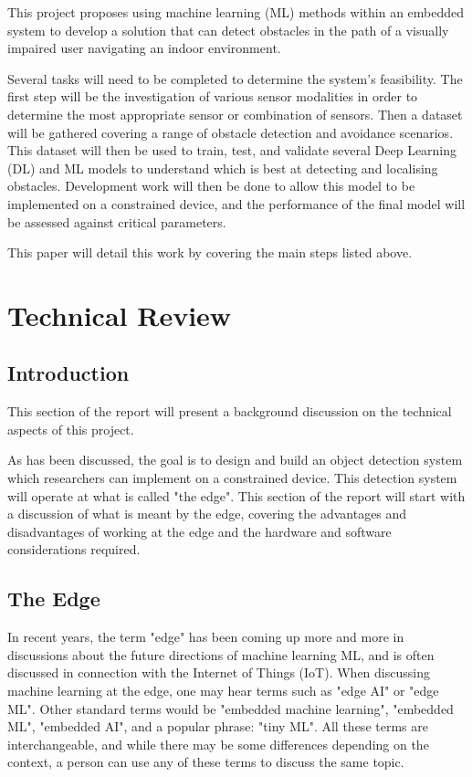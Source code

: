 \documentclass[conference]{IEEEtran}
\begin{document}
This project proposes using machine learning (ML) methods within an embedded system to develop a solution that can detect obstacles in the path of a visually impaired user navigating an indoor environment. 
 
Several tasks will need to be completed to determine the system's feasibility. The first step will be the investigation of various sensor modalities in order to determine the most appropriate sensor or combination of sensors. Then a dataset will be gathered covering a range of obstacle detection and avoidance scenarios. This dataset will then be used to train, test, and validate several Deep Learning (DL) and ML models to understand which is best at detecting and localising obstacles. Development work will then be done to allow this model to be implemented on a constrained device, and the performance of the final model will be assessed against critical parameters. 

This paper will detail this work by covering the main steps listed above. 

\section{Technical Review}
\subsection{Introduction}
This section of the report will present a background discussion on the technical aspects of this project. 

As has been discussed, the goal is to design and build an object detection system which researchers can implement on a constrained device. This detection system will operate at what is called "the edge". This section of the report will start with a discussion of what is meant by the edge, covering the advantages and disadvantages of working at the edge and the hardware and software considerations required. 

\subsection{The Edge}
In recent years, the term "edge" has been coming up more and more in discussions about the future directions of machine learning ML, and is often discussed in connection with the Internet of Things (IoT). When discussing machine learning at the edge, one may hear terms such as "edge AI" or "edge ML". Other standard terms would be "embedded machine learning", "embedded ML", "embedded AI", and a popular phrase: "tiny ML". All these terms are interchangeable, and while there may be some differences depending on the context, a person can use any of these terms to discuss the same topic.
\end{document}

